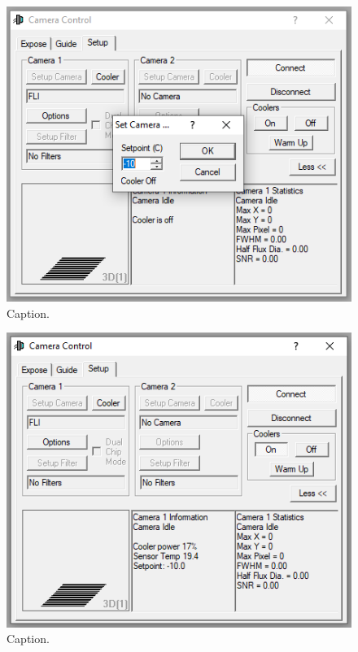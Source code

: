 \documentclass{article}
\begin{document}
	\begin{figure}[htbp!]
		\centering
		\includegraphics[scale=0.75]{images/maxim-3.png}
		\caption{Caption.}
		\label{fig:maxim-3}
	\end{figure}
	
	\begin{figure}[htbp!]
		\centering
		\includegraphics[scale=0.75]{images/maxim-4.png}
		\caption{Caption.}
		\label{fig:maxim-4}
	\end{figure}
	
\end{document}
